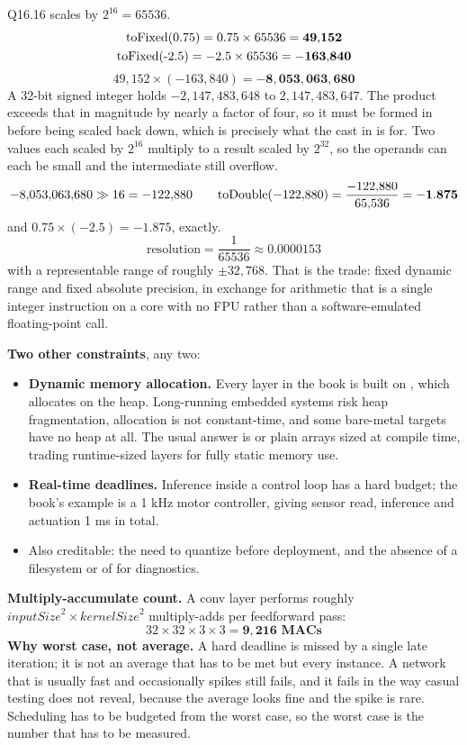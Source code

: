 Q16.16 scales by $2^{16} = 65536$.
\begin{gather*}
  \text{toFixed(0.75)} = 0.75 \times 65536 = \mathbf{49{,}152} \\
  \text{toFixed(-2.5)} = -2.5 \times 65536 = \mathbf{-163{,}840}
\end{gather*}
\[
  49{,}152 \times (-163{,}840) = \mathbf{-8{,}053{,}063{,}680}
\]
A 32-bit signed integer holds $-2{,}147{,}483{,}648$ to $2{,}147{,}483{,}647$. The product exceeds
that in magnitude by nearly a factor of four, so it must be formed in  before
being scaled back down, which is precisely what the cast in  is for. Two
values each scaled by $2^{16}$ multiply to a result scaled by $2^{32}$, so the operands can each be
small and the intermediate still overflow.
\[
  -8{,}053{,}063{,}680 \gg 16 = -122{,}880 \qquad
  \text{toDouble}(-122{,}880) = \frac{-122{,}880}{65{,}536} = \mathbf{-1.875}
\]
and $0.75 \times (-2.5) = -1.875$, exactly. 
\[
  \text{resolution} = \frac{1}{65536} \approx \mathbf{0.0000153}
\]
with a representable range of roughly $\pm 32{,}768$. That is the trade: fixed dynamic range and
fixed absolute precision, in exchange for arithmetic that is a single integer instruction on a core
with no FPU rather than a software-emulated floating-point call. 

\textbf{Two other constraints}, any two:
\begin{itemize}
  \item \textbf{Dynamic memory allocation.} Every layer in the book is built on ,
    which allocates on the heap. Long-running embedded systems risk heap fragmentation, allocation
    is not constant-time, and some bare-metal targets have no heap at all. The usual answer is
     or plain arrays sized at compile time, trading runtime-sized layers for fully
    static memory use.
  \item \textbf{Real-time deadlines.} Inference inside a control loop has a hard budget; the book's
    example is a 1 kHz motor controller, giving sensor read, inference and actuation 1 ms in total.
  \item Also creditable: the need to quantize before deployment, and the absence of a filesystem or
    of  for diagnostics.
\end{itemize}

\textbf{Multiply-accumulate count.} A conv layer performs roughly
$\mathit{inputSize}^2 \times \mathit{kernelSize}^2$ multiply-adds per feedforward pass:
\[
  32 \times 32 \times 3 \times 3 = \mathbf{9{,}216 \text{ MACs}}
\]
\textbf{Why worst case, not average.} A hard deadline is missed by a single late iteration; it is
not an average that has to be met but every instance. A network that is usually fast and
occasionally spikes still fails, and it fails in the way casual testing does not reveal, because the
average looks fine and the spike is rare. Scheduling has to be budgeted from the worst case, so the
worst case is the number that has to be measured. 

